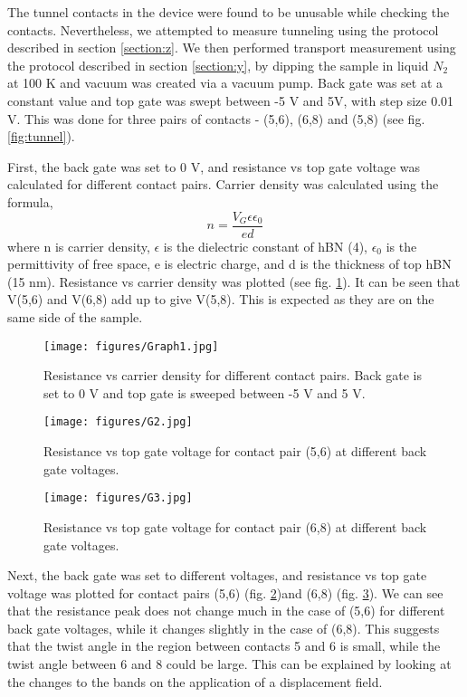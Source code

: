 The tunnel contacts in the device were found to be unusable while checking the contacts. Nevertheless, we attempted to measure tunneling using the protocol described in section \ref{section:z}. We then performed transport measurement using the protocol described in section \ref{section:y}, by dipping the sample in liquid $N_2$ at 100 K and vacuum was created via a vacuum pump. Back gate was set at a constant value and top gate was swept between -5 V and 5V, with step size 0.01 V. This was done for three pairs of contacts - (5,6), (6,8) and (5,8) (see fig. \ref{fig:tunnel}).

First, the back gate was set to 0 V, and resistance vs top gate voltage was calculated for different contact pairs. Carrier density was calculated using the formula, \begin{equation}
n=\frac{V_G\epsilon\epsilon_0}{ed}
\end{equation}
where n is carrier density, $\epsilon$ is the dielectric constant of hBN (4), $\epsilon_0$ is the permittivity of free space, e is electric charge, and d is the thickness of top hBN (15 nm). Resistance vs carrier density was plotted (see fig. \ref{fig:g1}). It can be seen that V(5,6) and V(6,8) add up to give V(5,8). This is expected as they are on the same side of the sample.

\begin{figure}[H]
	\centering
	\texttt{[image: figures/Graph1.jpg]}
	\caption{Resistance vs carrier density for different contact pairs. Back gate is set to 0 V and top gate is sweeped between -5 V and 5 V.}
	\label{fig:g1}
\end{figure}

\begin{figure}[H]
	\centering
	\texttt{[image: figures/G2.jpg]}
	\caption{Resistance vs top gate voltage for contact pair (5,6) at different back gate voltages.}
	\label{fig:g2}
\end{figure}

\begin{figure}[H]
	\centering
	\texttt{[image: figures/G3.jpg]}
	\caption{Resistance vs top gate voltage for contact pair (6,8) at different back gate voltages.}
	\label{fig:g5}
\end{figure}

Next, the back gate was set to different voltages, and resistance vs top gate voltage was plotted for contact pairs (5,6) (fig. \ref{fig:g2})and (6,8) (fig. \ref{fig:g5}). We can see that the resistance peak does not change much in the case of (5,6) for different back gate voltages, while it changes slightly in the case of (6,8). This suggests that the twist angle in the region between contacts 5 and 6 is small, while the twist angle between 6 and 8 could be large. This can be explained by looking at the changes to the bands on the application of a displacement field.

